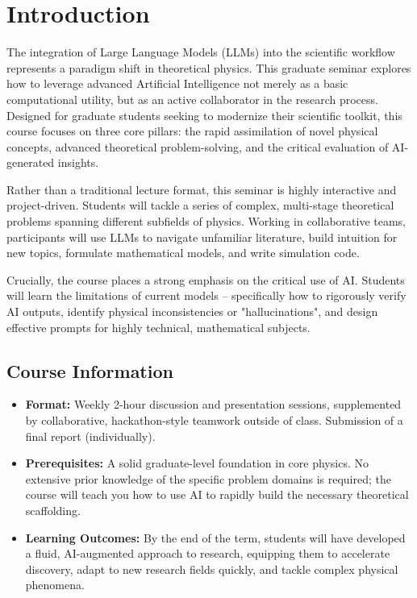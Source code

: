 \section{Introduction}

The integration of Large Language Models (LLMs) into the scientific workflow represents a paradigm shift in theoretical physics. This graduate seminar explores how to leverage advanced Artificial Intelligence not merely as a basic computational utility, but as an active collaborator in the research process. Designed for graduate students seeking to modernize their scientific toolkit, this course focuses on three core pillars: the rapid assimilation of novel physical concepts, advanced theoretical problem-solving, and the critical evaluation of AI-generated insights.

Rather than a traditional lecture format, this seminar is highly interactive and project-driven. Students will tackle a series of complex, multi-stage theoretical problems spanning different subfields of physics. Working in collaborative teams, participants will use LLMs to navigate unfamiliar literature, build intuition for new topics, formulate mathematical models, and write simulation code.

Crucially, the course places a strong emphasis on the critical use of AI. Students will learn the limitations of current models – specifically how to rigorously verify AI outputs, identify physical inconsistencies or "hallucinations", and design effective prompts for highly technical, mathematical subjects.


\subsection{Course Information}

\begin{itemize}
\item \textbf{Format:} Weekly 2-hour discussion and presentation sessions, supplemented by collaborative, hackathon-style teamwork outside of class. Submission of a final report (individually).
\item \textbf{Prerequisites:} A solid graduate-level foundation in core physics. No extensive prior knowledge of the specific problem domains is required; the course will teach you how to use AI to rapidly build the necessary theoretical scaffolding.
\item \textbf{Learning Outcomes:} By the end of the term, students will have developed a fluid, AI-augmented approach to research, equipping them to accelerate discovery, adapt to new research fields quickly, and tackle complex physical phenomena.
\end{itemize}

